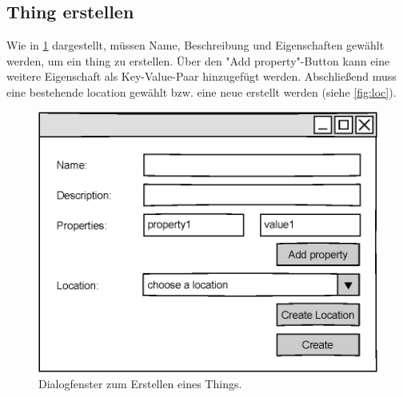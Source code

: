 \documentclass[a4paper, 12 pt]{article}
\begin{document}
\subsection{Thing erstellen}
Wie in \cref{fig:thing} dargestellt, müssen Name, Beschreibung und Eigenschaften gewählt werden, um ein \gls{thing} zu erstellen. Über den "{Add property}"{-Button} kann eine weitere Eigenschaft als Key-Value-Paar hinzugefügt werden. Abschließend muss eine bestehende \gls{location} gewählt bzw. eine neue erstellt werden (siehe \cref{fig:loc}).

\begin{figure}[htbp]
\centering
\includegraphics[scale=0.8]{images/thing}
\caption{\label{fig:thing}Dialogfenster zum Erstellen eines Things.}
\end{figure}
\end{document}
